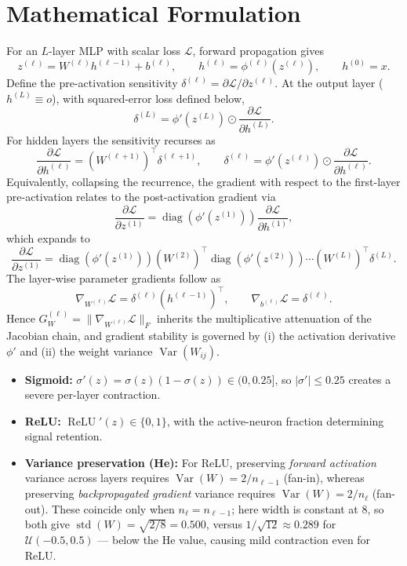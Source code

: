 \documentclass[11pt,a4paper]{article}
\begin{document}
\section{Mathematical Formulation}

For an $L$-layer MLP with scalar loss $\mathcal{L}$, forward propagation gives
\[
z^{(\ell)} = W^{(\ell)} h^{(\ell-1)} + b^{(\ell)},
\qquad
h^{(\ell)} = \phi^{(\ell)}\!\left(z^{(\ell)}\right),
\qquad
h^{(0)} = x .
\]
Define the pre-activation sensitivity $\delta^{(\ell)} = \partial\mathcal{L}/\partial z^{(\ell)}$. At the output layer ($h^{(L)} \equiv o$), with squared-error loss defined below,
\[
\delta^{(L)} = \phi'\!\left(z^{(L)}\right) \odot \frac{\partial\mathcal{L}}{\partial h^{(L)}} .
\]
For hidden layers the sensitivity recurses as
\[
\frac{\partial\mathcal{L}}{\partial h^{(\ell)}} = \left(W^{(\ell+1)}\right)^\top \delta^{(\ell+1)},
\qquad
\delta^{(\ell)} = \phi'\!\left(z^{(\ell)}\right) \odot \frac{\partial\mathcal{L}}{\partial h^{(\ell)}} .
\]
Equivalently, collapsing the recurrence, the gradient with respect to the first-layer pre-activation relates to the post-activation gradient via
\[
\frac{\partial\mathcal{L}}{\partial z^{(1)}}
=
\operatorname{diag}\!\left(\phi'\!\left(z^{(1)}\right)\right)
\frac{\partial\mathcal{L}}{\partial h^{(1)}} ,
\]
which expands to
\[
\frac{\partial\mathcal{L}}{\partial z^{(1)}}
=
\operatorname{diag}\!\left(\phi'\!\left(z^{(1)}\right)\right)
\left(W^{(2)}\right)^\top
\operatorname{diag}\!\left(\phi'\!\left(z^{(2)}\right)\right)
\cdots
\left(W^{(L)}\right)^\top
\delta^{(L)} .
\]
The layer-wise parameter gradients follow as
\[
\nabla_{W^{(\ell)}}\mathcal{L} = \delta^{(\ell)} \left(h^{(\ell-1)}\right)^\top,
\qquad
\nabla_{b^{(\ell)}}\mathcal{L} = \delta^{(\ell)} .
\]
Hence $G_W^{(\ell)} = \|\nabla_{W^{(\ell)}}\mathcal{L}\|_F$ inherits the multiplicative attenuation of the Jacobian chain, and gradient stability is governed by (i) the activation derivative $\phi'$ and (ii) the weight variance $\operatorname{Var}(W_{ij})$.

\begin{itemize}
\item \textbf{Sigmoid:} $\sigma'(z) = \sigma(z)(1-\sigma(z)) \in (0, 0.25]$, so $|\sigma'| \le 0.25$ creates a severe per-layer contraction.
\item \textbf{ReLU:} $\operatorname{ReLU}'(z) \in \{0,1\}$, with the active-neuron fraction determining signal retention.
\item \textbf{Variance preservation (He):} For ReLU, preserving \emph{forward activation} variance across layers requires $\operatorname{Var}(W) = 2/n_{\ell-1}$ (fan-in), whereas preserving \emph{backpropagated gradient} variance requires $\operatorname{Var}(W) = 2/n_\ell$ (fan-out). These coincide only when $n_\ell = n_{\ell-1}$; here width is constant at $8$, so both give $\operatorname{std}(W) = \sqrt{2/8} = 0.500$, versus $1/\sqrt{12} \approx 0.289$ for $\mathcal{U}(-0.5, 0.5)$ --- below the He value, causing mild contraction even for ReLU.
\end{itemize}
\end{document}
